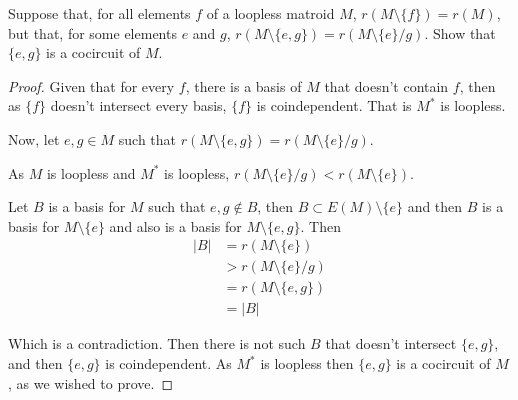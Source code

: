 \prob
{
	Suppose that, for all elements $f$ of a loopless matroid $M$, $r(M\setminus \{f\}) = r(M)$, but that,
	for some elements $e$ and $g$, $r(M \setminus \{e, g\}) = r(M \setminus \{e\} / g)$. Show that $\{e, g\}$
	is a cocircuit of $M$.
}
\begin{proof}
    Given that for every $f$, there is a basis of $M$ that doesn't contain $f$, then as $\{f\}$ doesn't
    intersect every basis, $\{f\}$ is coindependent. That is $M^*$ is loopless.\pn
    
    Now, let $e, g \in M$ such that $r(M \setminus \{e, g\}) = r(M \setminus \{e\} / g)$.\pn
    
    As $M$ is loopless and $M^*$ is loopless, $r(M \setminus \{e\} / g) < r (M \setminus \{e\})$.\pn
    
    Let $B$ is a basis for $M$ such that $e, g \notin B$, then $B \subset E(M) \setminus \{e\}$ and then
    $B$ is a basis for $M \setminus \{e\}$ and also is a basis for $M \setminus \{e, g\}$. Then
        \begin{align}
                |B| &=  r(M \setminus \{e\})        \\
                    &>  r(M \setminus \{e\} / g)    \\
                    &=   r(M \setminus \{e, g\})     \\
                    &=  |B|
        \end{align}
        
    Which is a contradiction. Then there is not such $B$ that doesn't intersect $\{e, g\}$, and then $\{e, g\}$ is
    coindependent. As $M^*$ is loopless then $\{e, g\}$ is a cocircuit of $M$, as we wished to prove.
\end{proof}